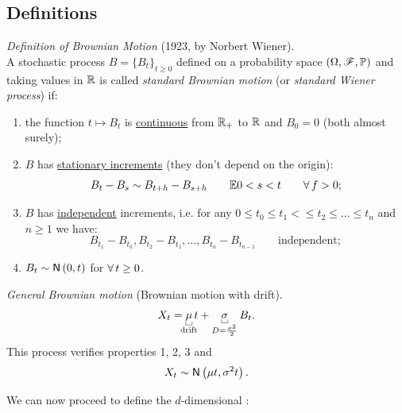 \documentclass[12pt]{report}
\begin{document}
\subsection{Definitions}
\begin{definition}
	\emph{Definition of Brownian Motion} (1923, by Norbert Wiener).\\
	A stochastic process $B={\{B_{t}\}}_{t\geq 0}$ defined on a probability space $(\Omega,\mathscr{F},\mathbb{P})$ and taking values in $\mathbb{R}$ is called \emph{standard Brownian motion} (or \emph{standard Wiener process}) if:
	\begin{enumerate}
		\item the function $t\mapsto B_{t}$ is \ul{continuous} from $\mathbb{R}_{+}$ to $\mathbb{R}$ and $B_{0}=0$ (both almost surely);
		\item $B$ has \ul{stationary increments} (they don't depend on the origin):
		\begin{equation*}
			B_{t}-B_{s}\sim B_{t+h}-B_{s+h}\qquad\mathbb{E} 0<s<t\qquad\forall\, f>0;
		\end{equation*}
		\item $B$ has \ul{independent} increments, i.e. for any $0\leq t_{0}\leq t_{1}<\leq t_{2}\leq\ldots\leq t_{n}$ and $n\geq 1$ we have:
		\begin{equation*}
			B_{t_1}-B_{t_0}, B_{t_2}-B_{t_1},\ldots,B_{t_{n}}-B_{t_{n-1}}\qquad\text{independent};
		\end{equation*}
		\item $B_{t}\sim\mathsf{N}\left(0,t\right)$ for $\forall\, t\geq 0$.
	\end{enumerate}
\end{definition}
\begin{definition}
	\emph{General Brownian motion} (Brownian motion with drift).\\
	\begin{equation*}
		X_{t}=\ubracketthin{\mu}_{\claptext{drift}} t+\ubracketthin{\sigma}_{D=\frac{\sigma^{2}}{2}} B_{t}.
	\end{equation*}
	This process verifies properties 1, 2, 3 and
	\begin{equation*}
		X_{t}\sim\mathsf{N}\left(\mu t,\sigma^{2}t\right).
	\end{equation*}
\end{definition}
We can now proceed to define the $d$-dimensional \bwm{}:
\end{document}
